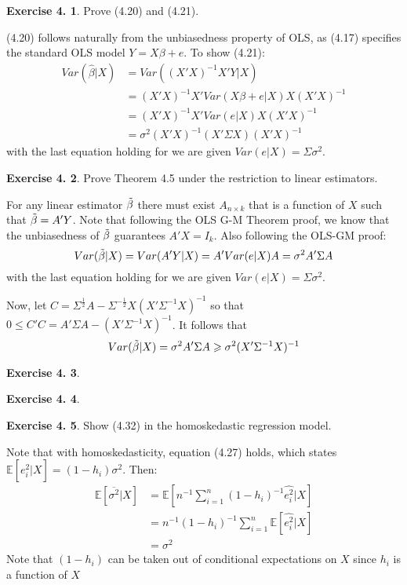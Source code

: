 \documentclass[12pt,letterpaper,reqno]{amsart}
\newcommand{\E}{\mathbb E}
\theoremstyle{plain}
\theoremstyle{definition}
\theoremstyle{definition}
\newtheorem{Exercise}{Exercise 4.}
\numberwithin{equation}{section}
\begin{document}
\begin{Exercise} Prove (4.20) and (4.21).

    (4.20) follows naturally from the unbiasedness property of OLS, as (4.17) specifies the standard OLS model $Y=X\beta+e$. To show (4.21):
    \[\begin{split}
        Var(\hat{\beta}|X) & = Var((X'X)^{-1}X'Y|X) \\ 
        & = (X'X)^{-1}X' Var(X\beta+e|X) X (X'X)^{-1} \\ 
        & = (X'X)^{-1}X' Var(e|X) X (X'X)^{-1} \\
        & = \sigma^2 (X'X)^{-1} (X' \Sigma X) (X'X)^{-1}
    \end{split}\]
    with the last equation holding for we are given $Var(e|X) = \Sigma \sigma^2 $.
\end{Exercise} 

\begin{Exercise} Prove Theorem 4.5 under the restriction to linear estimators.

    For any linear estimator $\Tilde{\beta}$ there must exist $A_{n \times k}$ that is a function of $X$ such that $\Tilde{\beta} = A'Y$. Note that following the OLS G-M Theorem proof, we know that the unbiasedness of $\Tilde{\beta}$ guarantees $A'X=I_k$. Also following the OLS-GM proof:
    \[
    Var(\Tilde{\beta}|X) = Var(A'Y|X) = A' Var(e|X) A = \sigma^2 A'\Sigma A
    \]
    with the last equation holding for we are given $Var(e|X) = \Sigma \sigma^2 $.
    
    Now, let $C = \Sigma^{\frac{1}{2}}A - \Sigma^{-\frac{1}{2}} X (X' \Sigma^{-1} X )^{-1} $ so that $ 0 \leqslant  C'C = A'\Sigma A - (X' \Sigma^{-1} X)^{-1} $. It follows that 
    \[
        Var(\Tilde{\beta}|X) = \sigma^2 A'\Sigma A \geqslant  \sigma^2 (X' \Sigma^{-1} X)^{-1}
    \]
\end{Exercise} 

\begin{Exercise} 
\end{Exercise}

\begin{Exercise} 
\end{Exercise}

\begin{Exercise} Show (4.32) in the homoskedastic regression model.

    Note that with homoskedasticity, equation (4.27) holds, which states $\E[\widehat{e_i^2}|X] = (1-h_i)\sigma^2$. Then:
    \[\begin{split}
        \E[\overline{\sigma^2}|X] & = \E[n^{-1}\sum_{i=1}^n(1-h_i)^{-1}\widehat{e_i^2}|X] \\
        & = n^{-1}(1-h_i)^{-1}\sum_{i=1}^n\E[\widehat{e_i^2}|X] \\
        & = \sigma^2
    \end{split}\]
    Note that $(1-h_i)$ can be taken out of conditional expectations on $X$ since $h_i$ is a function of $X$
\end{Exercise}
\end{document}
